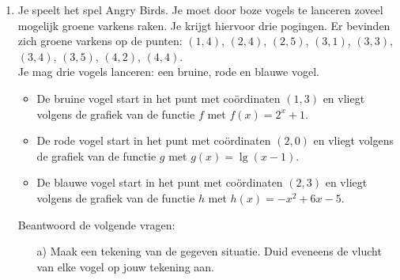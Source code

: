 \begin{frame}
\pause
\small{
\begin{enumerate}
\item<+->[3]
Je speelt het spel Angry Birds. Je moet door boze vogels te lanceren zoveel mogelijk groene varkens raken. Je krijgt hiervoor drie pogingen. Er bevinden zich groene varkens op de punten: $(1,4)$, $(2,4)$, $(2,5)$, $(3,1)$, $(3,3)$, $(3,4)$, $(3,5)$, $(4,2)$, $(4,4)$. \\
Je mag drie vogels lanceren: een bruine, rode en blauwe vogel. 
\begin{itemize}
\item De bruine vogel start in het punt met co\"ordinaten $(1,3)$ en vliegt volgens de grafiek van de functie $f$ met $f(x)= 2^x+1$.
\item De rode vogel start in het punt met co\"ordinaten $(2,0)$ en vliegt volgens de grafiek van de functie $g$ met $g(x)=\lg (x-1)$.
\item De blauwe vogel start in het punt met co\"ordinaten $(2,3)$ en vliegt volgens de grafiek van de functie $h$ met $h(x)=-x^2+6x-5$.
\end{itemize}

Beantwoord de volgende vragen:
\begin{enumerate}
\item[a)] Maak een tekening van de gegeven situatie. Duid eveneens de vlucht van elke vogel op jouw tekening aan. 
\end{enumerate}
\end{enumerate}}
\end{frame}

